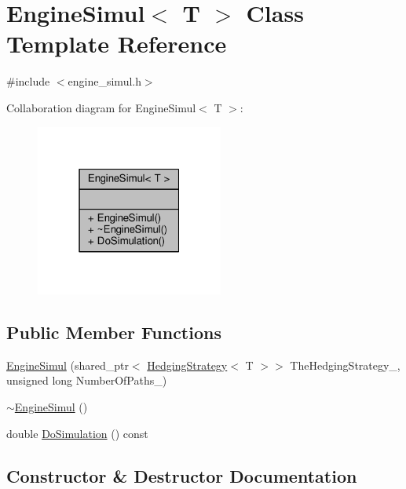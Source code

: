 \hypertarget{classEngineSimul}{}\section{Engine\+Simul$<$ T $>$ Class Template Reference}
\label{classEngineSimul}


{\ttfamily \#include $<$engine\+\_\+simul.\+h$>$}



Collaboration diagram for Engine\+Simul$<$ T $>$\+:
\nopagebreak
\begin{figure}[H]
\begin{center}
\leavevmode
\includegraphics[width=175pt]{classEngineSimul__coll__graph}
\end{center}
\end{figure}
\subsection*{Public Member Functions}
\begin{DoxyCompactItemize}
\item 
\hyperlink{classEngineSimul_a3d3243c9166e293532db8ad623657177}{Engine\+Simul} (shared\+\_\+ptr$<$ \hyperlink{classHedgingStrategy}{Hedging\+Strategy}$<$ T $>$$>$ The\+Hedging\+Strategy\+\_\+, unsigned long Number\+Of\+Paths\+\_\+)
\item 
\hyperlink{classEngineSimul_a82c248f5bd2d2b65348e0fec22c2a0e1}{$\sim$\+Engine\+Simul} ()
\item 
double \hyperlink{classEngineSimul_a7a7733a90fcc7e20bf4e0a3b9eb03d6d}{Do\+Simulation} () const
\end{DoxyCompactItemize}


\subsection{Constructor \& Destructor Documentation}
\hypertarget{classEngineSimul_a3d3243c9166e293532db8ad623657177}{}\label{classEngineSimul_a3d3243c9166e293532db8ad623657177} 

